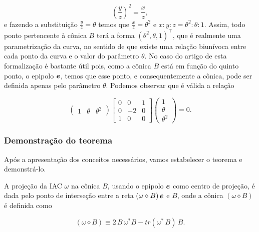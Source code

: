 \begin{equation*}
\left(\frac{y}{z}\right)^2=\frac{x}{z},
\end{equation*}
e fazendo a substituição $\displaystyle{\frac{y}{z}=\theta}$ temos que $\displaystyle{\frac{x}{z}=\theta^2}$ e $x:y:z=\theta^2:\theta:1$.
Assim, todo ponto pertencente à cônica $B$ terá a forma $(\theta^2,\theta,1)^\top$, que é realmente uma parametrização da curva, no sentido de que existe uma relação biunívoca entre cada ponto da curva e o valor do parâmetro $\theta$. No caso do artigo de \citep{2503343} esta formalização é bastante útil pois, como a cônica $B$ está em função do quinto ponto, o epipolo $\boldsymbol{e}$, temos que esse ponto, e consequentemente a cônica, pode ser definida apenas pelo parâmetro $\theta$. Podemos observar que é válida a relação

\begin{equation*}
\begin{pmatrix}
1&\theta&\theta^2
\end{pmatrix}
\begin{bmatrix}
0&0&1\\
0&-2&0\\
1&0&0
\end{bmatrix}
\begin{pmatrix}
1\\
\theta\\
\theta^2
\end{pmatrix}
=0.
\end{equation*}


\subsubsection{Demonstração do teorema}

Após a apresentação dos conceitos necessários, vamos estabelecer o teorema e demonstrá-lo.

\begin{teorema}
A projeção da IAC $\omega$ na cônica $B$, usando o epipolo $\boldsymbol{e}$ como centro de projeção, é dada pelo ponto de interseção entre a reta $(\omega\diamond B)\,\boldsymbol{e}$ e $B$, onde a cônica $(\omega\diamond B)$ é definida como

\begin{equation}\label{eq.conica-diamond}
(\omega \diamond B)\equiv 2\,B\,\omega^*B - tr(\omega^*\,B)\,B.
\end{equation}
\end{teorema}

